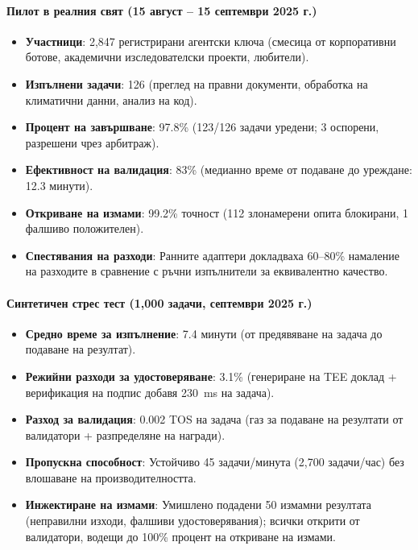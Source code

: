 \documentclass[11pt]{article}
\begin{document}
\paragraph{Пилот в реалния свят (15 август -- 15 септември 2025 г.)}
\begin{itemize}[noitemsep]
  \item \textbf{Участници}: 2,847 регистрирани агентски ключа (смесица от корпоративни ботове, академични изследователски проекти, любители).
  \item \textbf{Изпълнени задачи}: 126 (преглед на правни документи, обработка на климатични данни, анализ на код).
  \item \textbf{Процент на завършване}: 97.8\% (123/126 задачи уредени; 3 оспорени, разрешени чрез арбитраж).
  \item \textbf{Ефективност на валидация}: 83\% (медианно време от подаване до уреждане: 12.3 минути).
  \item \textbf{Откриване на измами}: 99.2\% точност (112 злонамерени опита блокирани, 1 фалшиво положителен).
  \item \textbf{Спестявания на разходи}: Ранните адаптери докладваха 60--80\% намаление на разходите в сравнение с ръчни изпълнители за еквивалентно качество.
\end{itemize}

\paragraph{Синтетичен стрес тест (1,000 задачи, септември 2025 г.)}
\begin{itemize}[noitemsep]
  \item \textbf{Средно време за изпълнение}: 7.4 минути (от предявяване на задача до подаване на резултат).
  \item \textbf{Режийни разходи за удостоверяване}: 3.1\% (генериране на TEE доклад + верификация на подпис добавя 230~ms на задача).
  \item \textbf{Разход за валидация}: 0.002 TOS на задача (газ за подаване на резултати от валидатори + разпределяне на награди).
  \item \textbf{Пропускна способност}: Устойчиво 45 задачи/минута (2,700 задачи/час) без влошаване на производителността.
  \item \textbf{Инжектиране на измами}: Умишлено подадени 50 измамни резултата (неправилни изходи, фалшиви удостоверявания); всички открити от валидатори, водещи до 100\% процент на откриване на измами.
\end{itemize}
\end{document}
